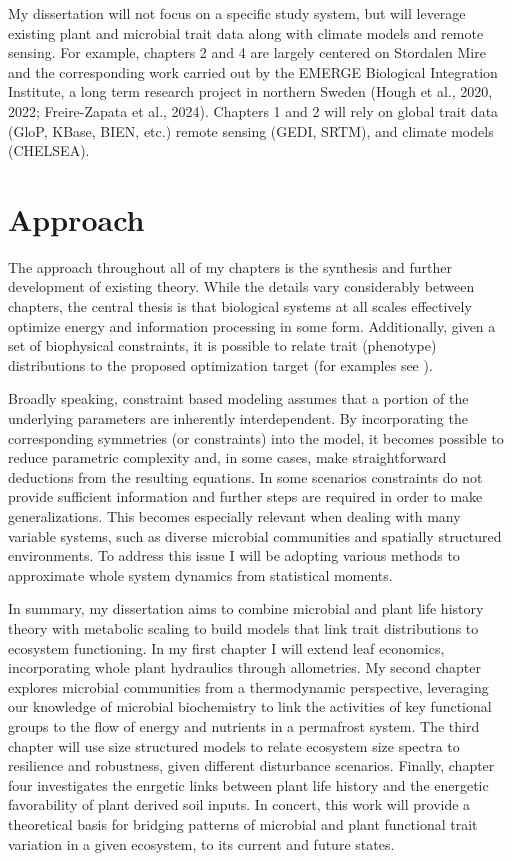 My dissertation will not focus on a specific study system, but will leverage existing plant and microbial trait data along with climate models and remote sensing. For example, chapters 2 and 4 are largely centered on Stordalen Mire and the corresponding work carried out by the EMERGE Biological Integration Institute, a long term research project in northern Sweden \cite{hough2020a} (Hough et al., 2020, 2022; Freire-Zapata et al., 2024). Chapters 1 and 2 will rely on global trait data (GloP, KBase, BIEN, etc.) remote sensing (GEDI, SRTM), and climate models (CHELSEA).

\section{Approach}

The approach throughout all of my chapters is the synthesis and further development of existing theory. While the details vary considerably between chapters, the central thesis is that biological systems at all scales effectively optimize energy and information processing in some form. Additionally, given a set of biophysical constraints, it is possible to relate trait (phenotype) distributions to the proposed optimization target (for examples see \cite{west1999a,krakauer2020a,harte2022a}).

Broadly speaking, constraint based modeling assumes that a portion of the underlying parameters are inherently interdependent. By incorporating the corresponding symmetries (or constraints) into the model, it becomes possible to reduce parametric complexity and, in some cases, make straightforward deductions from the resulting equations. In some scenarios constraints do not provide sufficient information and further steps are required in order to make generalizations. This becomes especially relevant when dealing with many variable systems, such as diverse microbial communities and spatially structured environments. To address this issue I will be adopting various methods to approximate whole system dynamics from statistical moments.

In summary, my dissertation aims to combine microbial and plant life history theory with metabolic scaling to build models that link trait distributions to ecosystem functioning. In my first chapter I will extend leaf economics, incorporating whole plant hydraulics through allometries. My second chapter explores microbial communities from a thermodynamic perspective, leveraging our knowledge of microbial biochemistry to link the activities of key functional groups to the flow of energy and nutrients in a permafrost system. The third chapter will use size structured models to relate ecosystem size spectra to resilience and robustness, given different disturbance scenarios. Finally, chapter four investigates the enrgetic links between plant life history and the energetic favorability of plant derived soil inputs. In concert, this work will provide a theoretical basis for bridging patterns of microbial and plant functional trait variation in a given ecosystem, to its current and future states.



